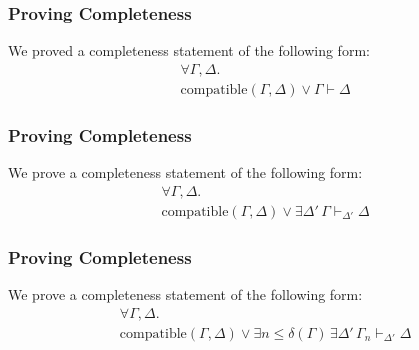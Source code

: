\documentclass{beamer}
\newcommand{\compatible}[2]{\mathrm{compatible}(#1,#2)}
\newcommand{\Sub}{\mathbf{Sub}}
\newcommand{\Reso}{\mathbf{Res}}
\newcommand{\mybar}[1]{\overline{#1}}
\begin{document}
\begin{comment}
\begin{frame}
\frametitle{Unit Resolution}

\begin{definition}[Unit Resolution Proof System] The Unit Resolution proof system consists 
of two rules:
%
\begin{center}
%
\AxiomC{$$}
\RightLabel{$\Sub \ C \subseteq C'$}
\UnaryInfC{$\Delta, C  \vdash_{URes} C'$}
\DisplayProof \\
%
\bigskip
%
\AxiomC{$\Delta \vdash_{URes} C \vee l$}
\AxiomC{$\Delta \vdash_{URes} \{ \mybar{l} \}$}
\RightLabel{$\Reso$}
\BinaryInfC{$\Delta \vdash_{URes} C$}
\DisplayProof \
%
\end{center}

The conflict graph corresponds to a unit resolution proof.

%
\end{definition}
\end{frame}
\end{comment}



\begin{frame}
\frametitle{Proving Completeness}
We proved a completeness statement of the following form:
\begin{align*}
 &\forall \Gamma, \Delta. \\
&\compatible{\Gamma}{\Delta} \vee \Gamma  \vdash \Delta
\end{align*}
\end{frame}

\begin{frame}
\frametitle{Proving Completeness}
We prove a completeness statement of the following form:
\begin{align*}
 &\forall \Gamma, \Delta. \\
&\compatible{\Gamma}{\Delta} \vee \exists \Delta' \, \Gamma  \vdash_{\Delta'} \Delta
\end{align*}
\end{frame}

\begin{frame}
\frametitle{Proving Completeness}
We prove a completeness statement of the following form:
\begin{align*}
 &\forall \Gamma, \Delta. \\
&\compatible{\Gamma}{\Delta} \vee \exists n \leq \delta(\Gamma) \,   \exists \Delta' \, \Gamma_n  \vdash_{\Delta'} \Delta
\end{align*}
\end{frame}
\end{document}
